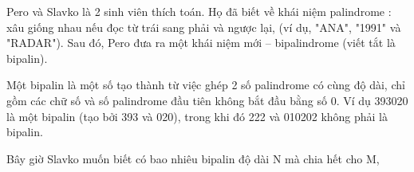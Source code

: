 Pero và Slavko là 2 sinh viên thích toán. Họ đã biết về khái niệm palindrome : xâu giống nhau nếu đọc từ trái sang phải và ngược lại, (ví dụ,  "ANA",  "1991"  và "RADAR"). Sau đó, Pero đưa ra một khái niệm mới –  bipalindrome (viết tắt là bipalin).  

   Một bipalin  là một số tạo thành từ việc ghép 2 số palindrome có cùng độ dài, chỉ gồm các chữ số và số palindrome đầu tiên không bắt đầu bằng số 0. Ví dụ  393020 là một bipalin (tạo bởi 393 và 020), trong khi đó 222 và 010202 không phải là bipalin.  

   Bây giờ Slavko muốn biết có bao nhiêu bipalin độ dài N mà chia hết cho M,